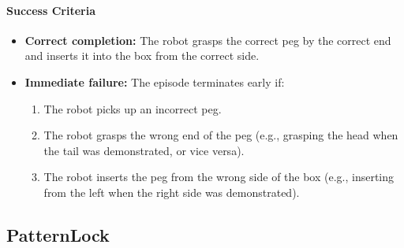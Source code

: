 \paragraph{Success Criteria}
\begin{itemize}[itemsep=1pt, topsep=0pt, leftmargin=*]
    \item \textbf{Correct completion:} The robot grasps the correct peg by the correct end and inserts it into the box from the correct side.
    \item \textbf{Immediate failure:} The episode terminates early if:
    \begin{enumerate}
        \item The robot picks up an incorrect peg.
        \item The robot grasps the wrong end of the peg (e.g., grasping the head when the tail was demonstrated, or vice versa).
        \item The robot inserts the peg from the wrong side of the box (e.g., inserting from the left when the right side was demonstrated).
    \end{enumerate}
\end{itemize}

\clearpage






\subsection{PatternLock}
\label{sec:task_patternlock}

\begin{table}
    \centering
    \caption{\textit{PatternLock} Task Configuration}
    \label{tab:patternlock_difficulty_config}
    \renewcommand{\arraystretch}{1.2}
\end{table}

